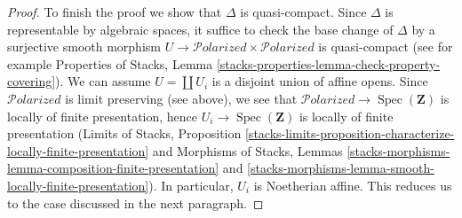 \documentclass{stacks-project}
\theoremstyle{plain}
\theoremstyle{definition}
\theoremstyle{remark}
\numberwithin{equation}{subsection}
\def\Spec{\mathop{\mathrm{Spec}}}
\def\Polarizedstack{\mathcal{P}\!\mathit{olarized}}
\begin{document}
\begin{proof}
\medskip\noindent
To finish the proof we show that $\Delta$ is quasi-compact. Since
$\Delta$ is representable by algebraic spaces, it suffice to check
the base change of $\Delta$ by a surjective smooth morphism
$U \to \Polarizedstack \times \Polarizedstack$ is quasi-compact
(see for example Properties of Stacks, Lemma
\ref{stacks-properties-lemma-check-property-covering}).
We can assume $U = \coprod U_i$ is a disjoint union of affine opens.
Since $\Polarizedstack$ is limit preserving (see above), we
see that $\Polarizedstack \to \Spec(\mathbf{Z})$ is locally of
finite presentation, hence $U_i \to \Spec(\mathbf{Z})$ is
locally of finite presentation
(Limits of Stacks, Proposition
\ref{stacks-limits-proposition-characterize-locally-finite-presentation}
and Morphisms of Stacks, Lemmas
\ref{stacks-morphisms-lemma-composition-finite-presentation} and
\ref{stacks-morphisms-lemma-smooth-locally-finite-presentation}).
In particular, $U_i$ is Noetherian affine. This reduces us to the
case discussed in the next paragraph.


\end{proof}
\end{document}
